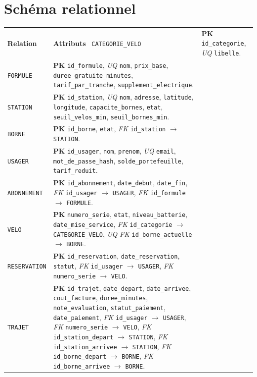 \documentclass[11pt,a4paper]{article}
\newcommand{\pk}{\textbf{PK}}
\newcommand{\fk}{\textit{FK}}
\newcommand{\uq}{\textit{UQ}}
\begin{document}
\section{Schéma relationnel}
\small
\begin{longtable}{>{\raggedright\arraybackslash}p{}>{\raggedright\arraybackslash}p{}}
\toprule
\textbf{Relation} & \textbf{Attributs}\
\midrule
\endhead
\bottomrule
\endfoot
\texttt{CATEGORIE\_VELO} & \pk{} \texttt{id\_categorie}, \uq{} \texttt{libelle}.\\
\texttt{FORMULE} & \pk{} \texttt{id\_formule}, \uq{} \texttt{nom}, \texttt{prix\_base}, \texttt{duree\_gratuite\_minutes}, \texttt{tarif\_par\_tranche}, \texttt{supplement\_electrique}.\\
\texttt{STATION} & \pk{} \texttt{id\_station}, \uq{} \texttt{nom}, \texttt{adresse}, \texttt{latitude}, \texttt{longitude}, \texttt{capacite\_bornes}, \texttt{etat}, \texttt{seuil\_velos\_min}, \texttt{seuil\_bornes\_min}.\\
\texttt{BORNE} & \pk{} \texttt{id\_borne}, \texttt{etat}, \fk{} \texttt{id\_station} $\rightarrow$ \texttt{STATION}.\\
\texttt{USAGER} & \pk{} \texttt{id\_usager}, \texttt{nom}, \texttt{prenom}, \uq{} \texttt{email}, \texttt{mot\_de\_passe\_hash}, \texttt{solde\_portefeuille}, \texttt{tarif\_reduit}.\\
\texttt{ABONNEMENT} & \pk{} \texttt{id\_abonnement}, \texttt{date\_debut}, \texttt{date\_fin}, \fk{} \texttt{id\_usager} $\rightarrow$ \texttt{USAGER}, \fk{} \texttt{id\_formule} $\rightarrow$ \texttt{FORMULE}.\\
\texttt{VELO} & \pk{} \texttt{numero\_serie}, \texttt{etat}, \texttt{niveau\_batterie}, \texttt{date\_mise\_service}, \fk{} \texttt{id\_categorie} $\rightarrow$ \texttt{CATEGORIE\_VELO}, \uq{} \fk{} \texttt{id\_borne\_actuelle} $\rightarrow$ \texttt{BORNE}.\\
\texttt{RESERVATION} & \pk{} \texttt{id\_reservation}, \texttt{date\_reservation}, \texttt{statut}, \fk{} \texttt{id\_usager} $\rightarrow$ \texttt{USAGER}, \fk{} \texttt{numero\_serie} $\rightarrow$ \texttt{VELO}.\\
\texttt{TRAJET} & \pk{} \texttt{id\_trajet}, \texttt{date\_depart}, \texttt{date\_arrivee}, \texttt{cout\_facture}, \texttt{duree\_minutes}, \texttt{note\_evaluation}, \texttt{statut\_paiement}, \texttt{date\_paiement}, \fk{} \texttt{id\_usager} $\rightarrow$ \texttt{USAGER}, \fk{} \texttt{numero\_serie} $\rightarrow$ \texttt{VELO}, \fk{} \texttt{id\_station\_depart} $\rightarrow$ \texttt{STATION}, \fk{} \texttt{id\_station\_arrivee} $\rightarrow$ \texttt{STATION}, \fk{} \texttt{id\_borne\_depart} $\rightarrow$ \texttt{BORNE}, \fk{} \texttt{id\_borne\_arrivee} $\rightarrow$ \texttt{BORNE}.\\

\end{longtable}
\end{document}
